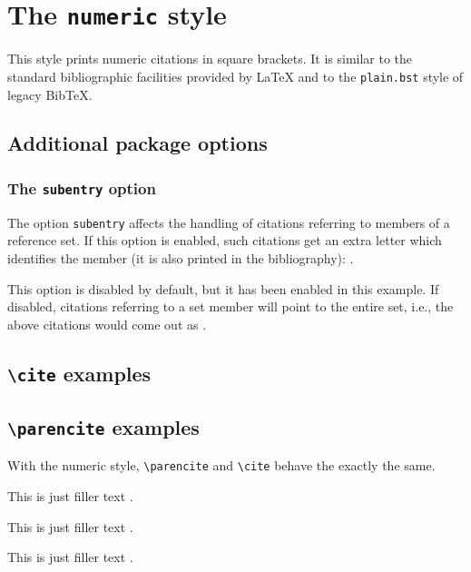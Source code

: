 \documentclass[a4paper]{article}
\newcommand{\cmd}[1]{\texttt{\textbackslash #1}}
\begin{document}
\section*{The \texttt{numeric} style}

This style prints numeric citations in square brackets. It is
similar to the standard bibliographic facilities provided by LaTeX
and to the \texttt{plain.bst} style of legacy BibTeX.

\subsection*{Additional package options}

\subsubsection*{The \texttt{subentry} option}

The option \texttt{subentry} affects the handling of citations
referring to members of a reference set. If this option is enabled,
such citations get an extra letter which identifies the member
(it is also printed in the bibliography):
\cite{glashow,yoon,salam,aksin,companion}.

This option is disabled by default, but it has been enabled
in this example. If disabled, citations referring to a set member
will point to the entire set, i.e., the above citations would
come out as
\cite{stdmodel,set,stdmodel,set,companion}.


\subsection*{\cmd{cite} examples}

\cite{companion}

\cite[59]{companion}

\cite[see][]{companion}

\cite[see][59--63]{companion}

\subsection*{\cmd{parencite} examples}
With the numeric style, \cmd{parencite} and \cmd{cite}
behave the exactly the same.

This is just filler text \parencite{companion}.

This is just filler text \parencite[59]{companion}.

This is just filler text \parencite[see][]{companion}.
\end{document}

